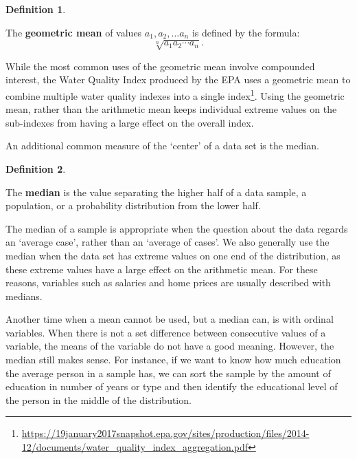 \documentclass[
]{book}
\theoremstyle{definition}
\newtheorem{definition}{Definition}[chapter]
\theoremstyle{definition}
\theoremstyle{definition}
\theoremstyle{definition}
\theoremstyle{remark}
\begin{document}
\begin{definition}
\protect\hypertarget{def:unlabeled-div-295}{}\label{def:unlabeled-div-295}

The \textbf{geometric mean} of values \(a_1, a_2, \ldots a_n\) is defined by the formula:
\[\sqrt[n]{a_1 a_2 \cdots a_n}.\]

\end{definition}

While the most common uses of the geometric mean involve compounded interest, the Water Quality Index produced by the EPA uses a geometric mean to combine multiple water quality indexes into a single index\footnote{\url{https://19january2017snapshot.epa.gov/sites/production/files/2014-12/documents/water_quality_index_aggregation.pdf}}. Using the geometric mean, rather than the arithmetic mean keeps individual extreme values on the sub-indexes from having a large effect on the overall index.

An additional common measure of the `center' of a data set is the median.

\begin{definition}
\protect\hypertarget{def:unlabeled-div-296}{}\label{def:unlabeled-div-296}

The \textbf{median} is the value separating the higher half of a data sample, a population, or a probability distribution from the lower half.

\end{definition}

The median of a sample is appropriate when the question about the data regards an `average case', rather than an `average of cases'. We also generally use the median when the data set has extreme values on one end of the distribution, as these extreme values have a large effect on the arithmetic mean. For these reasons, variables such as salaries and home prices are usually described with medians.

Another time when a mean cannot be used, but a median can, is with ordinal variables. When there is not a set difference between consecutive values of a variable, the means of the variable do not have a good meaning. However, the median still makes sense. For instance, if we want to know how much education the average person in a sample has, we can sort the sample by the amount of education in number of years or type and then identify the educational level of the person in the middle of the distribution.
\end{document}
